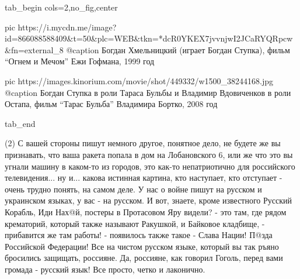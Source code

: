 \ifcmt
  tab_begin cols=2,no_fig,center

		 pic https://i.mycdn.me/image?id=866088588409&t=50&plc=WEB&tkn=*dcR0YKEX7jvvnjwI2JCaRYQRpcw&fn=external_8
		 @caption Богдан Хмельницкий (играет Богдан Ступка), фильм \enquote{Огнем и Мечом} Ежи Гофмана, 1999 год

		 pic https://images.kinorium.com/movie/shot/449332/w1500_38244168.jpg
		 @caption Богдан Ступка в роли Тараса Бульбы и Владимир Вдовиченков в роли Остапа, фильм \enquote{Тарас Бульба} Владимира Бортко, 2008 год

  tab_end
\fi

(2) С вашей стороны пишут немного другое, понятное дело, не будете же вы
признавать, что ваша ракета попала в дом на Лобановского 6, или же что это вы
угнали машину в каком-то из городов, это как-то непатриотично для российского
телевидения... ну и... какова истинная картина, кто наступает, кто отступает -
очень трудно понять, на самом деле. У нас о войне пишут на русском и украинском
языках, у вас - на русском. И вот, знаете, кроме известного Русский Корабль,
Иди Нах@й, постеры в Протасовом Яру видели? - это там, где рядом крематорий,
который также называют Ракушкой, и Байковое кладбище, - прибавится же там
работы! - появилось также такое - Слава Нации!  П@зда Российской Федерации! Все
на чистом русском языке, который вы так ръяно бросились защищать, россияне. Да,
россияне, как говорил Гоголь, перед вами громада - русский язык!  Все просто,
четко и лаконично.

